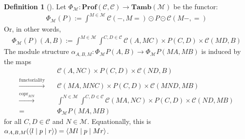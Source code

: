 \documentclass[11pt,letterpaper]{article}
\theoremstyle{plain}
\theoremstyle{definition}
\newtheorem{definition}[theorem]{Definition}
\newcommand{\C}{\mathscr{C}}
\newcommand{\M}{\mathscr{M}}
\newcommand{\Pastro}{\Phi}
\newcommand{\Prof}{\mathbf{Prof}}
\newcommand{\Tamb}{\mathbf{Tamb}}
\DeclareMathOperator{\copr}{copr}
\newcommand{\repthree}[3]{{\ensuremath \langle #1 \mid #2 \mid #3 \rangle}}
\begin{document}
\begin{definition}[{\cite[Section 5]{Doubles}}]
  Let $\Pastro_\M : \Prof(\C, \C) \to \Tamb(\M)$ be the functor:
  \begin{align*}
    \Pastro_\M(P) := \int^{M \in \M}  \C(-, M{=}) \odot P \odot \C(M-, {=})
  \end{align*}
  Or, in other words,
  \begin{align*}
    \Pastro_\M(P)(A,B) := \int^{M \in \M} \int^{C,D \in \C} \C(A, MC) \times P(C,D) \times  \C(MD, B)
  \end{align*}
  The module structure $\alpha_{A,B,M} : \Pastro_\M P(A,B) \to \Pastro_\M P (MA, MB)
  $ is induced by the maps
  \begin{align*}
    &\C(A, NC) \times P(C,D) \times  \C(ND, B) \\
    \xrightarrow{\text{functoriality}} \quad& \C(MA, MNC) \times P(C,D) \times  \C(MND, MB) \\
    \xrightarrow{\copr_{MN}} \quad&\int^{N \in \M} \int^{C,D \in \C} \C(MA, NC) \times P(C,D) \times  \C(ND, MB) \\
    = \quad&\Pastro_\M P (MA, MB)
  \end{align*}
  for all $C, D \in \C$ and $N \in \M$. Equationally, this is $\alpha_{A,B,M}(\repthree{l}{p}{r} ) = \repthree{Ml}{p}{Mr} $.
\end{definition}
\end{document}
